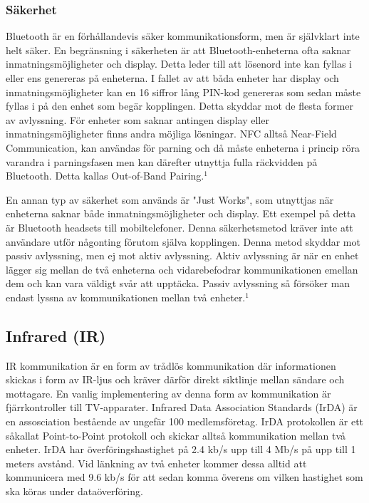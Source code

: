 \documentclass[a4paper,12pt,fleqn]{article}
\begin{document}
\subsubsection{Säkerhet}
Bluetooth är en förhållandevis säker kommunikationsform, men är självklart inte helt säker. En begränsning i säkerheten är att Bluetooth-enheterna ofta saknar inmatningsmöjligheter och display. Detta leder till att lösenord inte kan fyllas i eller ens genereras på enheterna. I fallet av att båda enheter har display och inmatningsmöjligheter kan en 16 siffror lång PIN-kod genereras som sedan måste fyllas i på den enhet som begär kopplingen. Detta skyddar mot de flesta former av avlyssning.
För enheter som saknar antingen display eller inmatningsmöjligheter finns andra möjliga lösningar. NFC alltså Near-Field Communication, kan användas för parning och då måste enheterna i princip röra varandra i parningsfasen men kan därefter utnyttja fulla räckvidden på Bluetooth. Detta kallas Out-of-Band Pairing.$^1$

En annan typ av säkerhet som används är "Just Works", som utnyttjas när enheterna saknar både inmatningsmöjligheter och display. Ett exempel på detta är Bluetooth headsets till mobiltelefoner. Denna säkerhetsmetod kräver inte att användare utför någonting förutom själva kopplingen. Denna metod skyddar mot passiv avlyssning, men ej mot aktiv avlyssning. 
Aktiv avlyssning är när en enhet lägger sig mellan de två enheterna och vidarebefodrar kommunikationen emellan dem och kan vara väldigt svår att upptäcka.
Passiv avlyssning så försöker man endast lyssna av kommunikationen mellan två enheter.$^1$
 
\subsection{Infrared (IR)}
IR kommunikation är en form av trådlös kommunikation där informationen skickas i form av IR-ljus och kräver därför direkt siktlinje mellan sändare och mottagare. En vanlig implementering av denna form av kommunikation är fjärrkontroller till TV-apparater.
Infrared Data Association Standards (IrDA) är en assosciation bestående av ungefär 100 medlemsföretag. IrDA protokollen är ett såkallat Point-to-Point protokoll och skickar alltså kommunikation mellan två enheter. IrDA har överföringshastighet på 2.4 kb/s upp till 4 Mb/s på upp till 1 meters avstånd. Vid länkning av två enheter kommer dessa alltid att kommunicera med 9.6 kb/s för att sedan komma överens om vilken hastighet som ska köras under dataöverföring.  
\end{document}
